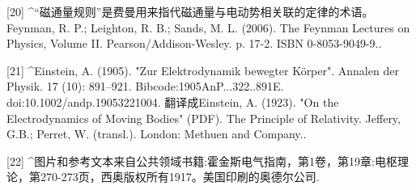 [20]
^“磁通量规则”是费曼用来指代磁通量与电动势相关联的定律的术语。Feynman, R. P.; Leighton, R. B.; Sands, M. L. (2006). The Feynman Lectures on Physics, Volume II. Pearson/Addison-Wesley. p. 17-2. ISBN 0-8053-9049-9..

[21]
^Einstein, A. (1905). "Zur Elektrodynamik bewegter Körper". Annalen der Physik. 17 (10): 891–921. Bibcode:1905AnP...322..891E. doi:10.1002/andp.19053221004. 翻译成Einstein, A. (1923). "On the Electrodynamics of Moving Bodies" (PDF). The Principle of Relativity. Jeffery, G.B.; Perret, W. (transl.). London: Methuen and Company..

[22]
^图片和参考文本来自公共领域书籍:霍金斯电气指南，第1卷，第19章:电枢理论，第270-273页，西奥版权所有1917。美国印刷的奥德尔公司.